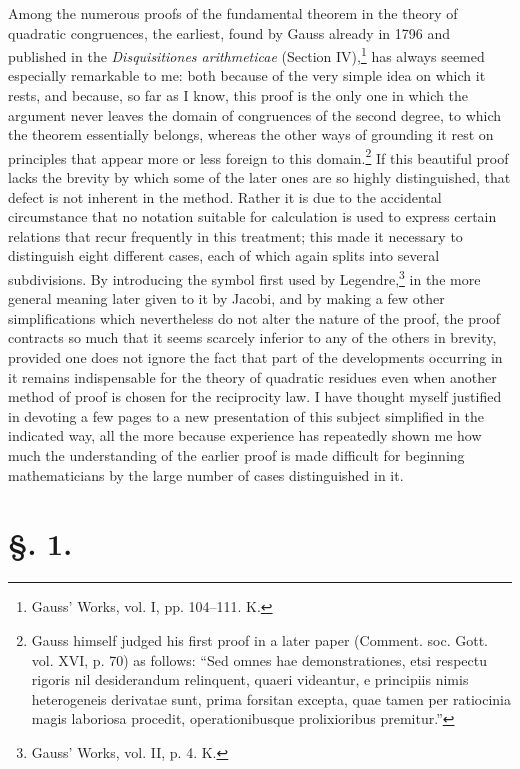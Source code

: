 \documentclass[11pt]{article}
\begin{document}
Among the numerous proofs of the fundamental theorem in the theory of quadratic congruences, the earliest, found by Gauss already in 1796 and published in the \emph{Disquisitiones arithmeticae} (Section IV),\footnote{Gauss' Works, vol. I, pp. 104--111. K.} has always seemed especially remarkable to me: both because of the very simple idea on which it rests, and because, so far as I know, this proof is the only one in which the argument never leaves the domain of congruences of the second degree, to which the theorem essentially belongs, whereas the other ways of grounding it rest on principles that appear more or less foreign to this domain.\footnote{Gauss himself judged his first proof in a later paper (Comment. soc. Gott. vol. XVI, p. 70) as follows: ``Sed omnes hae demonstrationes, etsi respectu rigoris nil desiderandum relinquent, quaeri videantur, e principiis nimis heterogeneis derivatae sunt, prima forsitan excepta, quae tamen per ratiocinia magis laboriosa procedit, operationibusque prolixioribus premitur.''} If this beautiful proof lacks the brevity by which some of the later ones are so highly distinguished, that defect is not inherent in the method. Rather it is due to the accidental circumstance that no notation suitable for calculation is used to express certain relations that recur frequently in this treatment; this made it necessary to distinguish eight different cases, each of which again splits into several subdivisions. By introducing the symbol first used by Legendre,\footnote{Gauss' Works, vol. II, p. 4. K.} in the more general meaning later given to it by Jacobi, and by making a few other simplifications which nevertheless do not alter the nature of the proof, the proof contracts so much that it seems scarcely inferior to any of the others in brevity, provided one does not ignore the fact that part of the developments occurring in it remains indispensable for the theory of quadratic residues even when another method of proof is chosen for the reciprocity law. I have thought myself justified in devoting a few pages to a new presentation of this subject simplified in the indicated way, all the more because experience has repeatedly shown me how much the understanding of the earlier proof is made difficult for beginning mathematicians by the large number of cases distinguished in it.

\section*{\S. 1.}
\end{document}
